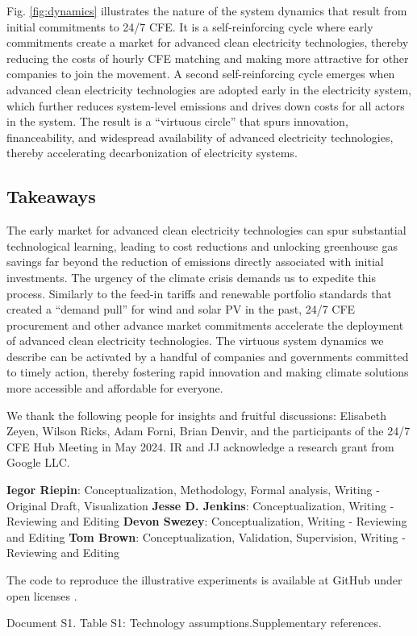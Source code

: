 \documentclass[pdflatex,sn-basic, Numbered]{sn-jnl}
\theoremstyle{thmstyleone}%
\theoremstyle{thmstyletwo}%
\theoremstyle{thmstylethree}%
\begin{document}
Fig. \ref{fig:dynamics} illustrates the nature of the system dynamics that result from initial commitments to 24/7 CFE. It is a self-reinforcing cycle where early commitments create a market for advanced clean electricity technologies, thereby reducing the costs of hourly CFE matching and making more attractive for other companies to join the movement. A second self-reinforcing cycle emerges when advanced clean electricity technologies are adopted early in the electricity system, which further reduces system-level emissions and drives down costs for all actors in the system. The result is a \enquote{virtuous circle} that spurs innovation, financeability, and widespread availability of advanced electricity technologies, thereby accelerating decarbonization of electricity systems.

\subsection*{Takeaways}\label{sec6}

The early market for advanced clean electricity technologies can spur substantial technological learning, leading to cost reductions and unlocking greenhouse gas savings far beyond the reduction of emissions directly associated with initial investments.
The urgency of the climate crisis demands us to expedite this process.
Similarly to the feed-in tariffs and renewable portfolio standards that created a \enquote{demand pull} for wind and solar PV in the past, 24/7 CFE procurement and other advance market commitments \cite{GoogleMicrosoftNucor} accelerate the deployment of advanced clean electricity technologies.
The virtuous system dynamics we describe can be activated by a handful of companies and governments committed to timely action, thereby fostering rapid innovation and making climate solutions more accessible and affordable for everyone.

\backmatter

 We thank the following people for insights and fruitful discussions: Elisabeth Zeyen, Wilson Ricks, Adam Forni, Brian Denvir, and the participants of the 24/7 CFE Hub Meeting in May 2024. IR and JJ acknowledge a research grant from Google LLC.

\textbf{Iegor Riepin}: Conceptualization, Methodology, Formal analysis, Writing - Original Draft, Visualization
\textbf{Jesse D. Jenkins}: Conceptualization, Writing - Reviewing and Editing
\textbf{Devon Swezey}: Conceptualization, Writing - Reviewing and Editing
\textbf{Tom Brown}: Conceptualization, Validation, Supervision, Writing - Reviewing and Editing

 The code to reproduce the illustrative experiments is available at GitHub under open licenses \cite{code247CFE}.

 Document S1. Table S1: Technology assumptions.Supplementary references.

\end{document}
